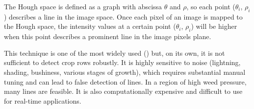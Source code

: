 The Hough space is defined as a graph with abscissa $\theta$ and $\rho$, so each point ($\theta_{i}$, $\rho_{i}$) describes a line in the image space. Once each pixel of an image is mapped to the Hough space, the intensity values at a certain point ($\theta_{i}$, $\rho_{i}$) will be higher when this point describes a prominent line in the image pixels plane. 

This technique is one of the most widely used (\citet{HTRTTracking}) but, on its own, it is not sufficient to detect crop rows robustly. It is highly sensitive to noise (lightning, shading, bushiness, various stages of growth), which requires substantial manual tuning and can lead to false detection of lines. In a region of high weed pressure, many lines are feasible. It is also computationally expensive and difficult to use for real-time applications. 

